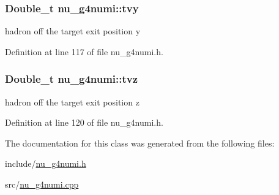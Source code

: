 \hypertarget{classnu__g4numi_ac81b906ee11d4c5e74a1b80378cae373}{
\subsubsection[{tvy}]{\setlength{\rightskip}{0pt plus 5cm}Double\-\_\-t nu\-\_\-g4numi\-::tvy}}\label{classnu__g4numi_ac81b906ee11d4c5e74a1b80378cae373}
hadron off the target exit position y 

Definition at line 117 of file nu\-\_\-g4numi.\-h.

\hypertarget{classnu__g4numi_adef9f7bf0e713b329e9af89ae32183ab}{
\subsubsection[{tvz}]{\setlength{\rightskip}{0pt plus 5cm}Double\-\_\-t nu\-\_\-g4numi\-::tvz}}\label{classnu__g4numi_adef9f7bf0e713b329e9af89ae32183ab}
hadron off the target exit position z 

Definition at line 120 of file nu\-\_\-g4numi.\-h.



The documentation for this class was generated from the following files\-:\begin{DoxyCompactItemize}
\item 
include/\hyperlink{nu__g4numi_8h}{nu\-\_\-g4numi.\-h}\item 
src/\hyperlink{nu__g4numi_8cpp}{nu\-\_\-g4numi.\-cpp}\end{DoxyCompactItemize}
